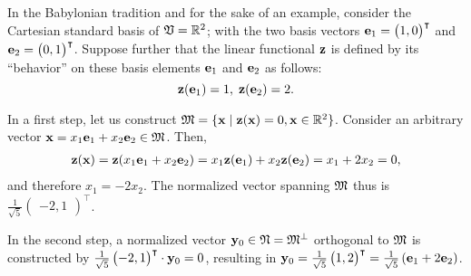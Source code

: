 {\color{blue}
\bexample
In the Babylonian tradition
and for the sake of an example,
consider the Cartesian standard basis of ${\frak V} = \mathbb{R}^2$;
with the two basis vectors
${\bf e}_1 =\begin{pmatrix} 1,0\end{pmatrix}^\intercal $ and
${\bf e}_2 =\begin{pmatrix} 0,1\end{pmatrix}^\intercal $.
Suppose further that the linear functional ${\bf z}$ is defined by its ``behavior'' on these basis elements
${\bf e}_1$  and
${\bf e}_2$ as follows:
\begin{equation}
 {\bf z}({\bf e}_1) = 1 ,
\; {\bf z}({\bf e}_2) = 2.
\end{equation}

In a first step, let us construct
${\frak M}=\{ {\bf x} \mid {\bf z}({\bf x}) = 0, {\bf x} \in  \mathbb{R}^2\}$.
Consider an arbitrary vector ${\bf x} = x_1 {\bf e}_1 + x_2 {\bf e}_2 \in {\frak M}$.
Then,
\begin{equation}
\begin{split}
{\bf z}  ( {\bf x} )
=  {\bf z}  ( x_1 {\bf e}_1 + x_2 {\bf e}_2 )
=  x_1 {\bf z}  ( {\bf e}_1) + x_2 {\bf z}  ( {\bf e}_2 )
=  x_1  + 2 x_2 = 0
,
\end{split}
\end{equation}
and therefore $x_1 =  - 2 x_2 $.
The normalized vector spanning ${\frak M}$ thus is
$\frac{1}{\sqrt{5}} \begin{pmatrix} -2,1\end{pmatrix}^\intercal $.

In the second step, a normalized vector  ${\bf y}_0 \in  {\frak N} = {\frak M}^\perp$ orthogonal to ${\frak M}$ is constructed by
$\frac{1}{\sqrt{5}} \begin{pmatrix} -2,1\end{pmatrix}^\intercal  \cdot {\bf y}_0=0$,
resulting in
${\bf y}_0=\frac{1}{\sqrt{5}} \begin{pmatrix} 1,2\end{pmatrix}^\intercal  =
\frac{1}{\sqrt{5}} \left( {\bf e}_1 +2 {\bf e}_2 \right) $.

}
